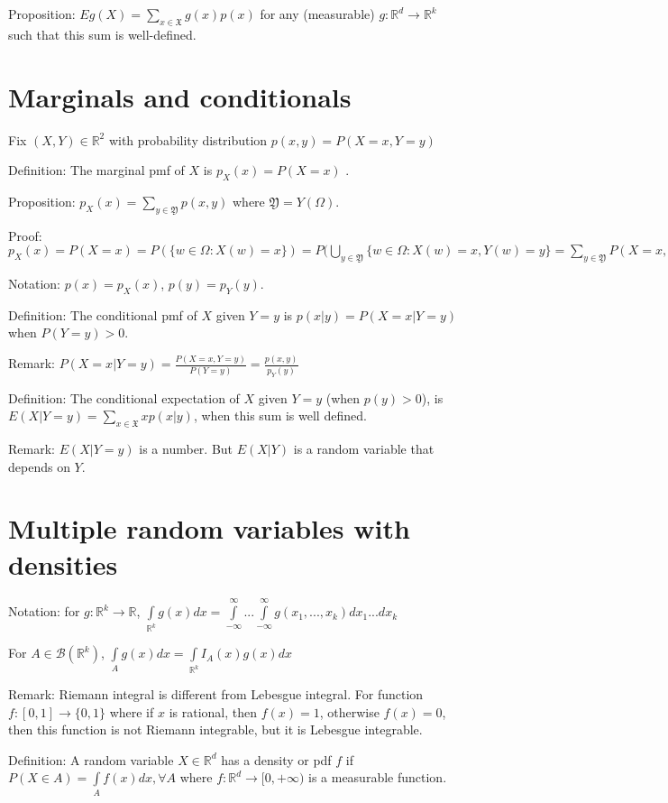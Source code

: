 \documentclass[12pt]{article}
\newcommand{\B}{\mathcal{B}}
\begin{document}
Proposition: $Eg(X)=\sum\limits_{x\in\mathfrak{X}} g(x)p(x)$ for
any (measurable) $g:\mathbb{R}^d\rightarrow\mathbb{R}^k$
such that this sum is well-defined.

\section{Marginals and conditionals}

Fix $(X,Y)\in\mathbb{R}^2$ with probability distribution $p(x,y)=P(X=x,Y=y)$

Definition: The marginal pmf of $X$ is $p_X(x)=P(X=x)$ .

Proposition: $p_X(x)=\sum\limits_{y\in\mathfrak{Y}} p(x,y)$ where $\mathfrak{Y}=Y(\Omega)$.

Proof: $p_X(x) = P(X=x) = P(\{w\in\Omega:X(w)=x\}) = P(\bigcup\limits_{y\in\mathfrak{Y}} \{w\in\Omega:X(w)=x,Y(w)=y\}
=\sum\limits_{y\in\mathfrak{Y}}P(X=x,Y=y)=\sum\limits_{y\in\mathfrak{Y}}p(x,y)$

Notation: $p(x)=p_X(x)$, $p(y)=p_Y(y)$.

Definition: The conditional pmf of $X$ given $Y=y$
is $p(x|y)=P(X=x|Y=y)$ when $P(Y=y)>0$.

Remark: $P(X=x|Y=y)=\frac{P(X=x,Y=y)}{P(Y=y)}=\frac{p(x,y)}{p_Y(y)}$

Definition: The conditional expectation of $X$ given $Y=y$ (when $p(y)>0$),
is $E(X|Y=y)=\sum\limits_{x\in\mathfrak{X}} x p(x|y)$,
when this sum is well defined.

Remark: $E(X|Y=y)$ is a number.
But $E(X|Y)$ is a random variable that depends on $Y$.

\section{Multiple random variables with densities}

Notation: for $g:\mathbb{R}^k\rightarrow\mathbb{R}$,
$\int\limits_{\mathbb{R}^k} g(x)dx = \int\limits_{-\infty}^{\infty}...\int\limits_{-\infty}^{\infty}g(x_1,...,x_k)dx_1...dx_k$

For $A\in\B(\mathbb{R}^k)$, $\int\limits_{A}g(x)dx=\int\limits_{\mathbb{R}^k}I_A(x)g(x)dx$

Remark: Riemann integral is different from Lebesgue integral. For function $f:[0,1]\rightarrow\{0,1\}$ where if $x$ is rational,
then $f(x)=1$, otherwise $f(x)=0$, then this function is not Riemann integrable, but it is Lebesgue integrable.

Definition: A random variable $X\in\mathbb{R}^d$ has a density or pdf $f$ if
$P(X\in A)=\int\limits_Af(x)dx,\forall A$ where $f:\mathbb{R}^d\rightarrow[0,+\infty)$ is a measurable function.
\end{document}
